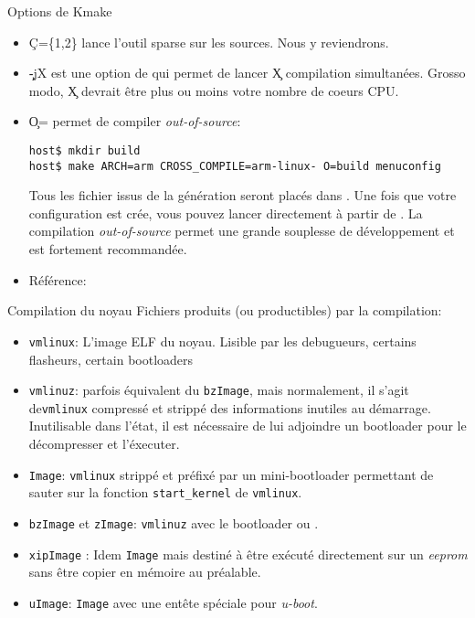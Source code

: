 \begin{frame}[fragile=singleslide]{Options de Kmake}
\begin{itemize} 
  \item  \c{C=\{1,2\}} lance  l'outil  sparse sur  les  sources. Nous  y
    reviendrons.
  \item  \c{-jX} est  une option  de   qui permet  de lancer
    \c{X}  compilation simultanées.  Grosso modo,  \c{X}  devrait être
    plus ou moins votre nombre de coeurs CPU.
  \item \c{O=} permet de compiler \emph{out-of-source}:
    \begin{lstlisting}
host$ mkdir build
host$ make ARCH=arm CROSS_COMPILE=arm-linux- O=build menuconfig
    \end{lstlisting} %
    Tous  les  fichier  issus  de  la génération  seront  placés  dans
    .  Une fois  que  votre configuration  est crée,  vous
    pouvez lancer  directement  à partir de . La
    compilation  \emph{out-of-source} permet  une grande  souplesse de
    développement et est fortement recommandée.
  \item Référence: 
  \end{itemize} 
\end{frame}

\begin{frame}[fragile=singleslide]{Compilation du noyau}
  Fichiers produits (ou productibles) par la compilation:
  \begin{itemize}
  \item  \verb+vmlinux+:  L'image  ELF  du  noyau.   Lisible  par  les
    debugueurs, certains flasheurs, certain bootloaders
  \item  \verb+vmlinuz+: parfois  équivalent  du \verb+bzImage+,  mais
    normalement, il  s'agit de\verb+vmlinux+ compressé  et strippé des
    informations inutiles  au démarrage. Inutilisable  dans l'état, il
    est nécessaire de lui adjoindre un bootloader pour le décompresser
    et l'éxecuter.
  \item  \verb+Image+:  \verb+vmlinux+   strippé  et  préfixé  par  un
    mini-bootloader   permettant    de   sauter   sur    la   fonction
    \verb+start_kernel+ de \verb+vmlinux+.
  \item  \verb+bzImage+  et   \verb+zImage+:  \verb+vmlinuz+  avec  le
    bootloader  ou .
  \item  \verb+xipImage+  :  Idem  \verb+Image+ mais  destiné  à  être
    exécuté  directement  sur un  \emph{eeprom}  sans  être copier  en
    mémoire au préalable.
  \item  \verb+uImage+:  \verb+Image+ avec  une  entête spéciale  pour
    \emph{u-boot}.
  \end{itemize}
\end{frame}

